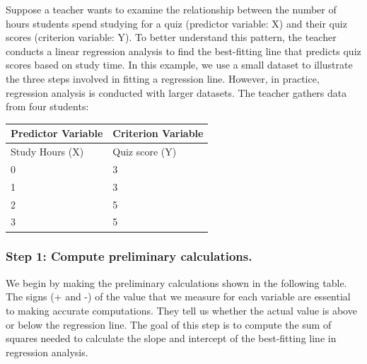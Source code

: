 \documentclass[
  letterpaper,
  DIV=11,
  numbers=noendperiod]{scrreprt}
\begin{document}
Suppose a teacher wants to examine the relationship between the number
of hours students spend studying for a quiz (predictor variable: X) and
their quiz scores (criterion variable: Y). To better understand this
pattern, the teacher conducts a linear regression analysis to find the
best-fitting line that predicts quiz scores based on study time. In this
example, we use a small dataset to illustrate the three steps involved
in fitting a regression line. However, in practice, regression analysis
is conducted with larger datasets. The teacher gathers data from four
students:

\begin{longtable}[]{@{}ll@{}}
\toprule\noalign{}
Predictor Variable & Criterion Variable \\
\midrule\noalign{}
\endhead
\bottomrule\noalign{}
\endlastfoot
Study Hours (X) & Quiz score (Y) \\
0 & 3 \\
1 & 3 \\
2 & 5 \\
3 & 5 \\
\end{longtable}

\subsubsection*{Step 1: Compute preliminary
calculations.}\label{step-1-compute-preliminary-calculations.}

We begin by making the preliminary calculations shown in the following
table. The signs (+ and -) of the value that we measure for each
variable are essential to making accurate computations. They tell us
whether the actual value is above or below the regression line. The goal
of this step is to compute the sum of squares needed to calculate the
slope and intercept of the best-fitting line in regression analysis.
\end{document}
